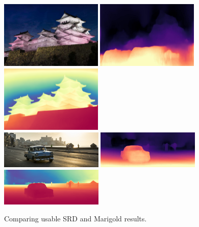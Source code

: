 \documentclass[12pt, letterpaper]{article}
\begin{document}
\begin{figure}[!ht]
    \begin{center}
        \includegraphics[height = 3.2cm]{himejicastle_event_2}
        \includegraphics[height = 3.2cm]{himejicastle_event_2_disp}
        \includegraphics[height = 3.2cm]{himejicastle_event_2_pred_colored}\\
        \includegraphics[height = 1.8cm]{test_image}
        \includegraphics[height = 1.8cm]{test_image_disp}
        \includegraphics[height = 1.8cm]{test_image_pred_colored}

        \caption{Comparing usable SRD and Marigold results.}
        \label{compSRDMRG}
    \end{center}
\end{figure}
\end{document}
